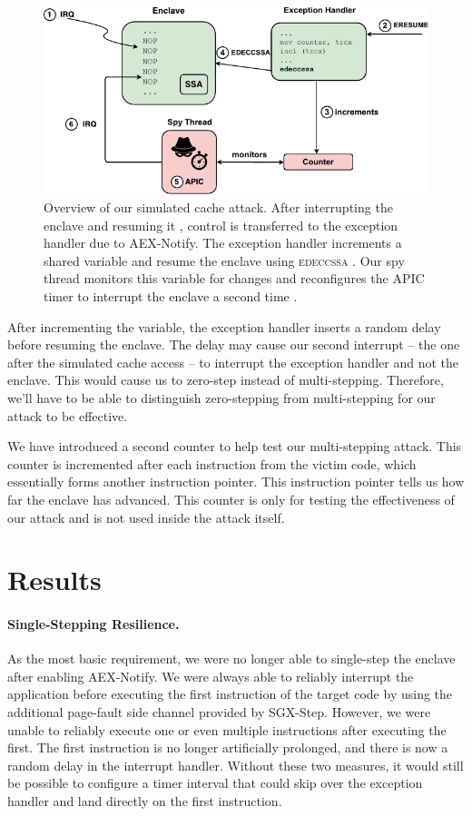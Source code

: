 \documentclass{llncs}
\begin{document}
\begin{figure}[t]
  \includegraphics{images/cache-attack.pdf}
  \caption{Overview of our simulated cache attack.
    After interrupting the enclave  and resuming it ,
    control is transferred to the exception handler due to AEX-Notify.
    The exception handler increments a shared variable 
    and resume the enclave using \textsc{edeccssa} .
    Our spy thread monitors this variable for changes and reconfigures
    the APIC timer  to interrupt the enclave a second time .}
\end{figure}

After incrementing the variable, the exception handler inserts a random delay
before resuming the enclave.
The delay may cause our second interrupt -- the one after the simulated cache
access -- to interrupt the exception handler and not the enclave.
This would cause us to zero-step instead of multi-stepping.
Therefore, we'll have to be able to distinguish zero-stepping from
multi-stepping for our attack to be effective.

We have introduced a second counter to help test our multi-stepping attack.
This counter is incremented after each instruction from the victim code,
which essentially forms another instruction pointer.
This instruction pointer tells us how far the enclave has advanced.
This counter is only for testing the effectiveness of our attack
and is not used inside the attack itself.

\section{Results}

\paragraph{Single-Stepping Resilience.}
As the most basic requirement,
we were no longer able to single-step the enclave after enabling AEX-Notify.
We were always able to reliably interrupt the application
before executing the first instruction of the target code
by using the additional page-fault side channel provided by SGX-Step.
However, we were unable to reliably execute one or
even multiple instructions after executing the first.
The first instruction is no longer artificially prolonged,
and there is now a random delay in the interrupt handler.
Without these two measures,
it would still be possible to configure a timer interval
that could skip over the exception handler and land directly on the first instruction.
\end{document}
